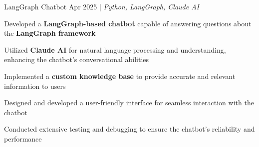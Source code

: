 \resumeSubheadings
{LangGraph Chatbot }
{Apr 2025}
{}{}{| \textit{Python, LangGraph, Claude AI}}
\resumeItemListStart
\item Developed a \textbf{LangGraph-based chatbot} capable of answering questions about the \textbf{LangGraph framework}
\item Utilized \textbf{Claude AI} for natural language processing and understanding, enhancing the chatbot's conversational abilities
\item Implemented a \textbf{custom knowledge base} to provide accurate and relevant information to users
\item Designed and developed a user-friendly interface for seamless interaction with the chatbot
\item Conducted extensive testing and debugging to ensure the chatbot's reliability and performance
\resumeItemListEnd
